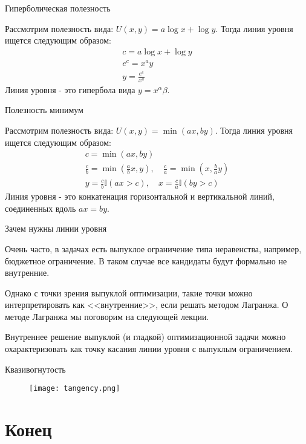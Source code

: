\documentclass{beamer}
\begin{document}
\begin{frame}{Гиперболическая полезность}

Рассмотрим полезность вида: $U(x, y) = a \log x + \log y$. Тогда линия уровня ищется следующим образом: 
\begin{gather*}
c =  a \log x + \log y\\
e^{c} = x^a y\\
y =\frac{e^{c}}{x^a}
\end{gather*}
Линия уровня - это гипербола вида $y = x^\alpha \beta$.

\end{frame}

\begin{frame}{Полезность минимум}

Рассмотрим полезность вида: $U(x, y) = \min(ax, by)$. Тогда линия уровня ищется следующим образом: 
\begin{gather*}
c = \min(ax, by)\\
\frac{c}{b}= \min(\frac{a}{b}x, y), \quad \frac{c}{a}= \min(x, \frac{b}{a}y)\\
y = \frac{c}{b} \mathbb{I}(ax > c), \quad x = \frac{c}{a} \mathbb{I}(by > c)
\end{gather*}
Линия уровня - это конкатенация горизонтальной и вертикальной линий, соединенных вдоль $ax = by$.

\end{frame}

\begin{frame}{Зачем нужны линии уровня}

Очень часто, в задачах есть выпуклое ограничение типа неравенства, например, бюджетное ограничение. В таком случае все кандидаты будут формально не внутренние. 

Однако с точки зрения выпуклой оптимизации, такие точки можно интерпретировать как <<внутренние>>, если решать методом Лагранжа. О методе Лагранжа мы поговорим на следующей лекции.

Внутреннее решение выпуклой (и гладкой) оптимизационной задачи можно охарактеризовать как точку касания линии уровня с выпуклым ограничением.

\end{frame}

\begin{frame}{Квазивогнутость}

\begin{figure}[hbt]
\centering
\texttt{[image: tangency.png]}
\end{figure}

\end{frame}

\section{Конец}
\end{document}
